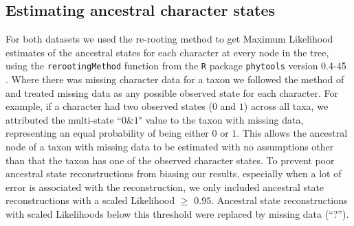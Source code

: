 \documentclass[10pt,letterpaper]{article}
\begin{document}
\subsection{Estimating ancestral character states}
For both datasets we used the re-rooting method \citep{Yang01121995,Garland2000} to get Maximum Likelihood estimates of the ancestral states for each character at every node in the tree, using the \texttt{rerootingMethod} function from the \texttt{R} package \texttt{phytools} version 0.4-45 \citep{phytools,R}.
Where there was missing character data for a taxon we followed the method of \cite{Claddis} and treated missing data as any possible observed state for each character.
For example, if a character had two observed states ($0$ and $1$) across all taxa, we attributed the multi-state ``$0$\&$1$" value to the taxon with missing data, representing an equal probability of being either $0$ or $1$.
This allows the ancestral node of a taxon with missing data to be estimated with no assumptions other than that the taxon has one of the observed character states.
To prevent poor ancestral state reconstructions from biasing our results, especially when a lot of error is associated with the reconstruction, we only included ancestral state reconstructions with a scaled Likelihood $\geq$ $0.95$.
Ancestral state reconstructions with scaled Likelihoods below this threshold were replaced by missing data (``?'').
\end{document}
